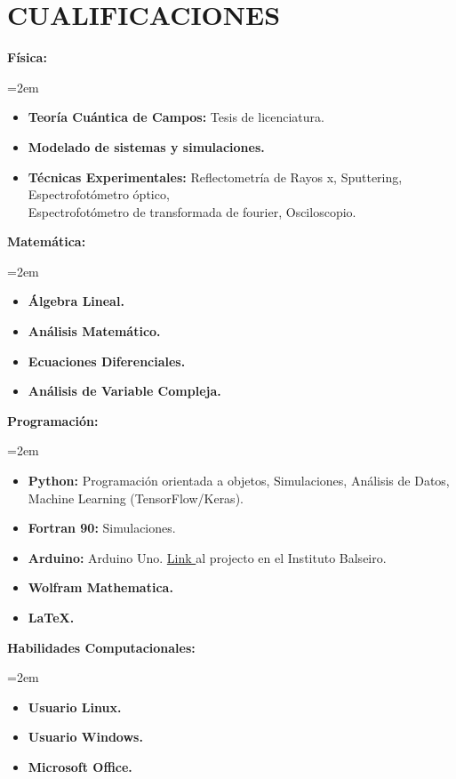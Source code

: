 \documentclass[paper=letter,fontsize=11pt]{scrartcl} %
\newcommand{\sepspace}{\vspace*{1em}}		%
\newcommand{\NewPart}[2]{\section*{\uppercase{#1} \small \normalfont #2}}
\newcommand{\WorkEntry}[5]{
		\noindent \textbf{#1}
        \noindent \small \textit{#2}
        \hfill      %
        \colorbox{White}{%
			\parbox{6em}{%
			\hfill\color{Black}#3}} \par  %
		\noindent \textit{#4} \par        %
		\noindent\hangindent=2em\hangafter=0 \small #5 %
		\normalsize \par}
\begin{document}
\NewPart{Cualificaciones}{}



\sepspace

\WorkEntry{Física:}{}{}{}{
\begin{itemize}
\item \textbf{Teoría Cuántica de Campos:} Tesis de licenciatura.
\item \textbf{Modelado de sistemas y simulaciones.}
\item \textbf{Técnicas Experimentales:} Reflectometría de Rayos x, Sputtering, Espectrofotómetro óptico, \\ Espectrofotómetro de transformada de fourier, Osciloscopio.
\end{itemize}
}

\sepspace

\WorkEntry{Matemática:}{}{}{}{
\begin{itemize}
\item \textbf{Álgebra Lineal.}
\item \textbf{Análisis Matemático.}
\item \textbf{Ecuaciones Diferenciales.}
\item \textbf{Análisis de Variable Compleja.} 
\end{itemize}
}

\sepspace

\WorkEntry{Programación:}{}{}{}{
\begin{itemize}
\item \textbf{Python:} Programación orientada a objetos, Simulaciones, Análisis de Datos, Machine Learning (TensorFlow/Keras).
\item \textbf{Fortran 90:} Simulaciones.
\item \textbf{Arduino:} Arduino Uno. {\href{https://drive.google.com/drive/folders/1y01BjDnIPS2QOX3Vo68r9A8HA9tstj1S}{Link }} al projecto en el Instituto Balseiro.
\item \textbf{Wolfram Mathematica.} 
\item \textbf{LaTeX.}
\end{itemize}
}

\sepspace

\WorkEntry{Habilidades Computacionales:}{}{}{}{
\begin{itemize}
\item \textbf{Usuario Linux.}
\item \textbf{Usuario Windows.}
\item \textbf{Microsoft Office.}
\end{itemize}
}
\end{document}
